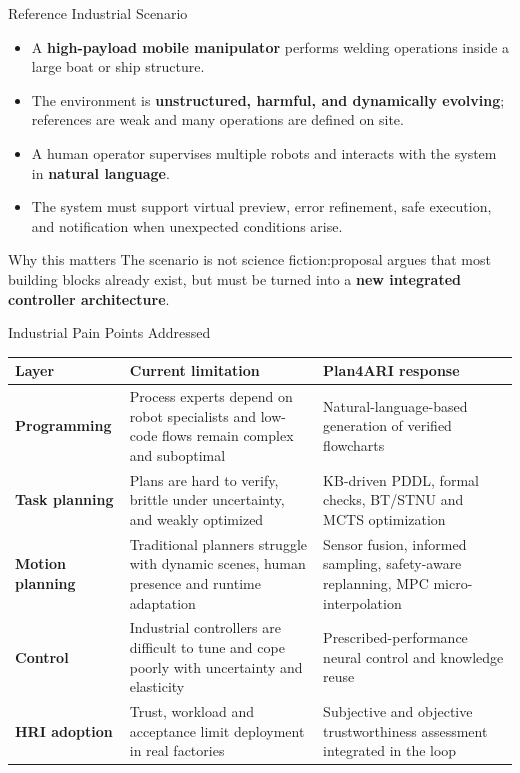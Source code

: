 \documentclass[aspectratio=169,10pt]{beamer}
\begin{document}
\begin{frame}{Reference Industrial Scenario}

\begin{itemize}
  \item A \textbf{high-payload mobile manipulator} performs welding operations inside a large boat or ship structure.
  \item The environment is \textbf{unstructured, harmful, and dynamically evolving}; references are weak and many operations are defined on site.
  \item A human operator supervises multiple robots and interacts with the system in \textbf{natural language}.
  \item The system must support virtual preview, error refinement, safe execution, and notification when unexpected conditions arise.
\end{itemize}
\begin{block}{Why this matters}
The scenario is not science fiction:\@the proposal argues that most building blocks already exist, but must be turned into a \textbf{new integrated controller architecture}. 
\end{block}

\end{frame}


\begin{frame}{Industrial Pain Points Addressed}

\small
\begin{tabularx}{\textwidth}{>{\bfseries}p{} X X}
\toprule
Layer & Current limitation & Plan4ARI response \\
\midrule
Programming & Process experts depend on robot specialists and low-code flows remain complex and suboptimal & Natural-language-based generation of verified flowcharts \\
Task planning & Plans are hard to verify, brittle under uncertainty, and weakly optimized & KB-driven PDDL, formal checks, BT/STNU and MCTS optimization \\
Motion planning & Traditional planners struggle with dynamic scenes, human presence and runtime adaptation & Sensor fusion, informed sampling, safety-aware replanning, MPC micro-interpolation \\
Control & Industrial controllers are difficult to tune and cope poorly with uncertainty and elasticity & Prescribed-performance neural control and knowledge reuse \\
HRI adoption & Trust, workload and acceptance limit deployment in real factories & Subjective and objective trustworthiness assessment integrated in the loop \\
\bottomrule
\end{tabularx}

\end{frame}
\end{document}
